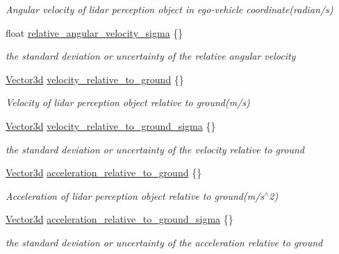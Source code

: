 \begin{DoxyCompactItemize}
\begin{DoxyCompactList}\small\item\em Angular velocity of lidar perception object in ego-\/vehicle coordinate(radian/s) \end{DoxyCompactList}\item 
float \hyperlink{structmaf__perception__interface_1_1LidarPerceptionObjectData_acac950941f55796da6c716c737931cfa}{relative\+\_\+angular\+\_\+velocity\+\_\+sigma} \{\}
\begin{DoxyCompactList}\small\item\em the standard deviation or uncertainty of the relative angular velocity \end{DoxyCompactList}\item 
\hyperlink{structmaf__perception__interface_1_1Vector3d}{Vector3d} \hyperlink{structmaf__perception__interface_1_1LidarPerceptionObjectData_a679dfeddb72555a05c171f5c222125e3}{velocity\+\_\+relative\+\_\+to\+\_\+ground} \{\}
\begin{DoxyCompactList}\small\item\em Velocity of lidar perception object relative to ground(m/s) \end{DoxyCompactList}\item 
\hyperlink{structmaf__perception__interface_1_1Vector3d}{Vector3d} \hyperlink{structmaf__perception__interface_1_1LidarPerceptionObjectData_a63856fa20bdcebb359aa97e9ea9f1d01}{velocity\+\_\+relative\+\_\+to\+\_\+ground\+\_\+sigma} \{\}
\begin{DoxyCompactList}\small\item\em the standard deviation or uncertainty of the velocity relative to ground \end{DoxyCompactList}\item 
\hyperlink{structmaf__perception__interface_1_1Vector3d}{Vector3d} \hyperlink{structmaf__perception__interface_1_1LidarPerceptionObjectData_ae66f7f05776584d611ddb717538bf60b}{acceleration\+\_\+relative\+\_\+to\+\_\+ground} \{\}
\begin{DoxyCompactList}\small\item\em Acceleration of lidar perception object relative to ground(m/s$^\wedge$2) \end{DoxyCompactList}\item 
\hyperlink{structmaf__perception__interface_1_1Vector3d}{Vector3d} \hyperlink{structmaf__perception__interface_1_1LidarPerceptionObjectData_afa9e7bdb7397da2b1ef0e2a0a7a15bb8}{acceleration\+\_\+relative\+\_\+to\+\_\+ground\+\_\+sigma} \{\}
\begin{DoxyCompactList}\small\item\em the standard deviation or uncertainty of the acceleration relative to ground \end{DoxyCompactList}\item 

\end{DoxyCompactItemize}
